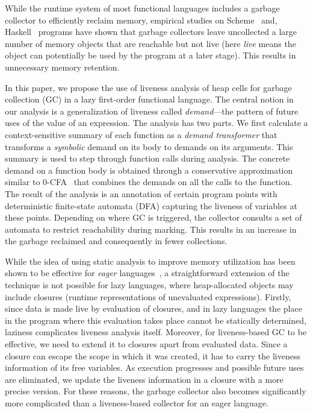 \documentclass[9pt,nonatbib]{sigplanconf}
\begin{document}
While  the runtime  system  of most  functional  languages includes  a
garbage collector to efficiently  reclaim memory, empirical studies on
Scheme~\cite{karkare06effectiveness}  and,  Haskell~\cite{rojemo96lag}
programs have shown that garbage  collectors leave uncollected a large
number of  memory objects that are  reachable but not live  (here {\em
  live} means the  object can potentially be used by  the program at a
later stage).  This results in unnecessary memory retention.

In this paper,  we propose the use of liveness  analysis of heap cells
for garbage collection (GC) in a lazy first-order functional language.
The central  notion in  our analysis is  a generalization  of liveness
called {\em  demand}---the pattern of future  uses of the value  of an
expression.   The  analysis  has  two parts.   We  first  calculate  a
context-sensitive  summary   of  each   function  as  a   {\em  demand
  transformer} that transforms a {\em  symbolic} demand on its body to
demands  on its  arguments.   This  summary is  used  to step  through
function calls  during analysis.   The concrete  demand on  a function
body  is  obtained through  a  conservative  approximation similar  to
0-CFA~\cite{Shivers:1988} that  combines the demands on  all the calls
to  the function.   The result  of the  analysis is  an annotation  of
certain program points with  deterministic finite-state automata (DFA)
capturing the  liveness of  variables at  these points.   Depending on
where GC  is triggered, the  collector consults  a set of  automata to
restrict reachability during marking.  This  results in an increase in
the garbage reclaimed and consequently in fewer collections.


While  the idea  of  using static  analysis  to improve  memory
  utilization  has  been  shown  to   be  effective  for  {\em  eager}
  languages~\cite{asati14lgc,       HofmannJ03,       inoue88analysis,
    lee05static}, a straightforward extension  of the technique is not
  possible  for  lazy  languages,  where  heap-allocated  objects  may
  include   closures    (runtime   representations    of   unevaluated
  expressions).
Firstly, since  data is made  live by  evaluation of closures,  and in
lazy languages  the place in  the program where this  evaluation takes
place cannot  be statically determined, laziness  complicates liveness
analysis itself.  Moreover, for liveness-based  GC to be effective, we
need to  extend it  to closures  apart from  evaluated data.   Since a
closure can escape the scope in which  it was created, it has to carry
the  liveness  information  of   its  free  variables.   As  execution
progresses  and possible  future uses  are eliminated,  we update  the
liveness  information  in  a  closure with  a  more  precise  version.
For these  reasons,  the  garbage   collector  also  becomes
significantly more  complicated than a liveness-based  collector for an
eager language. 
\end{document}
